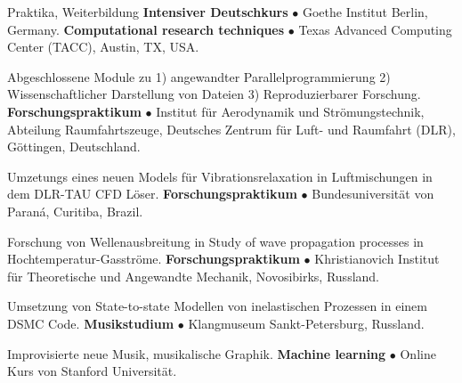 \begin{rubric}{Praktika, Weiterbildung}
%
	\textbf{Intensiver Deutschkurs} $\bullet$ Goethe Institut Berlin, Germany.
\entry*[Jul. 2021]%
	\textbf{Computational research techniques} $\bullet$ Texas Advanced Computing Center (TACC), Austin, TX, USA.
    \par Abgeschlossene Module zu 1) angewandter Parallelprogrammierung 2) Wissenschaftlicher Darstellung von Dateien 3) Reproduzierbarer Forschung.
%
	\textbf{Forschungspraktikum} $\bullet$ Institut f\"{u}r Aerodynamik und Str\"{o}mungstechnik, Abteilung Raumfahrtszeuge, Deutsches Zentrum f\"{u}r Luft- und Raumfahrt (DLR), G\"{o}ttingen, Deutschland.
    \par Umzetungs eines neuen Models f\"{u}r Vibrationsrelaxation in Luftmischungen in dem DLR-TAU CFD L\"{o}ser.
\entry*[Oct. 2016]%
	\textbf{Forschungspraktikum} $\bullet$ Bundesuniversität von Paraná, Curitiba, Brazil.
    \par Forschung von Wellenausbreitung in Study of wave propagation processes in Hochtemperatur-Gasstr\"{o}me.
\entry*[Feb. 2016]%
	\textbf{Forschungspraktikum} $\bullet$ Khristianovich Institut f\"{u}r Theoretische und Angewandte Mechanik, Novosibirks, Russland.
    \par Umsetzung von State-to-state Modellen von inelastischen Prozessen in einem DSMC Code.
\entry*[2015-2016]%
	\textbf{Musikstudium} $\bullet$ Klangmuseum Sankt-Petersburg, Russland.
    \par Improvisierte neue Musik, musikalische Graphik.
%
	\textbf{Machine learning} $\bullet$ Online Kurs von Stanford Universit\"{a}t.
\end{rubric}